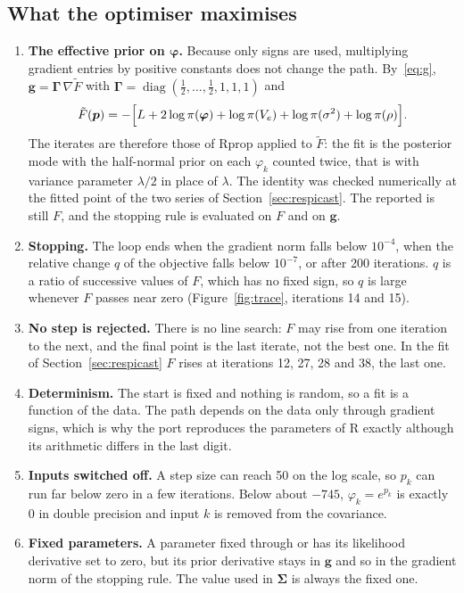 \documentclass[11pt,a4paper]{article}
\newcommand{\code}[1]{\texttt{\detokenize{#1}}}
\newcommand{\Sig}{\bm{\Sigma}}
\newcommand{\ve}{V_e}
\DeclareMathOperator{\diag}{diag}
\numberwithin{equation}{section}
\begin{document}
\subsection{What the optimiser maximises}
\label{sec:effective}
\begin{enumerate}[label=(\roman*)]
\item \textbf{The effective prior on $\bm\varphi$.} Because only signs are used, multiplying
gradient entries by positive constants does not change the path. By~\eqref{eq:g},
$\bm{g}=\bm{\Gamma}\,\nabla\tilde F$ with $\bm\Gamma=\diag(\tfrac12,\dots,\tfrac12,1,1,1)$ and
\begin{equation}
\tilde F(\bm{p})=-\Bigl[L+2\log\pi(\bm\varphi)+\log\pi(\ve)+\log\pi(\sigma^2)+\log\pi(\rho)\Bigr].
\end{equation}
The iterates are therefore those of Rprop applied to $\tilde F$: the fit is the posterior mode
with the half-normal prior on each $\varphi_k$ counted twice, that is with variance parameter
$\lambda/2$ in place of $\lambda$. The identity was checked numerically at the fitted point of the
two series of Section~\ref{sec:respicast}. The reported \code{nllpost} is still $F$, and
the stopping rule is evaluated on $F$ and on $\bm{g}$.
\item \textbf{Stopping.} The loop ends when the gradient norm falls below $10^{-4}$, when the
relative change $q$ of the objective falls below $10^{-7}$, or after 200 iterations. $q$ is a
ratio of successive values of $F$, which has no fixed sign, so $q$ is large whenever $F$ passes
near zero (Figure~\ref{fig:trace}, iterations 14 and 15).
\item \textbf{No step is rejected.} There is no line search: $F$ may rise from one iteration to
the next, and the final point is the last iterate, not the best one. In the fit of
Section~\ref{sec:respicast} $F$ rises at iterations 12, 27, 28 and 38, the last one.
\item \textbf{Determinism.} The start is fixed and nothing is random, so a fit is a function of
the data. The path depends on the data only through gradient signs, which is why the port
reproduces the parameters of R exactly although its arithmetic differs in the last digit.
\item \textbf{Inputs switched off.} A step size can reach 50 on the log scale, so $p_k$ can run
far below zero in a few iterations. Below about $-745$, $\varphi_k=e^{p_k}$ is exactly 0 in double
precision and input $k$ is removed from the covariance.
\item \textbf{Fixed parameters.} A parameter fixed through \code{fixedpars} or \code{rhofixed}
has its likelihood derivative set to zero, but its prior derivative stays in $\bm{g}$ and so in the
gradient norm of the stopping rule. The value used in $\Sig$ is always the fixed one.
\end{enumerate}
\end{document}
